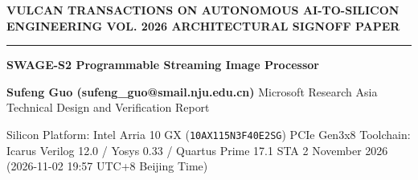 \documentclass[11pt,a4paper]{article}
\begin{document}
{\scriptsize\sffamily\textcolor{vulcan}{\textbf{VULCAN TRANSACTIONS ON AUTONOMOUS AI-TO-SILICON ENGINEERING \hfill VOL. 2026 \textperiodcentered{} ARCHITECTURAL SIGNOFF PAPER}}\par}

\vspace{1pt}\textcolor{vulcan}{\rule{\textwidth}{1.2pt}}\vspace{4pt}

\begin{center}

{\sffamily\LARGE\bfseries SWAGE-S2 Programmable Streaming Image Processor\par}\vspace{3pt}

{\small\sffamily\textbf{Sufeng Guo (\allowbreak{}sufeng\_\allowbreak{}guo@smail.nju.edu.cn)\allowbreak{}} \textperiodcentered{} Microsoft Research Asia \textperiodcentered{} Technical Design and Verification Report\par}\vspace{1pt}

{\scriptsize\sffamily\textcolor{black!75}{Silicon Platform: Intel Arria 10 GX (\texttt{10AX115N3F40E2SG}) PCIe Gen3x8 \textperiodcentered{} Toolchain: Icarus Verilog 12.0 / Yosys 0.33 / Quartus Prime 17.1 STA \textperiodcentered{} 2 November 2026 (\allowbreak{}2026-11-02 19:57 UTC+\allowbreak{}8 Beijing Time)\allowbreak{}}\par}

\end{center}\vspace{2pt}

\renewcommand{\abstractname}{\textcolor{vulcanblue}{Abstract}}\begin{abstract}\noindent SWAGE-S2 extends the preserved SWAGE-S1 scaler with programmable signed 3x3 convolution and forward-2x2 RGGB demosaic. Frame-atomic configuration selects scaling alone or spatial processing followed by scaling. Separate three-line circular buffers avoid frame-sized storage. Software-vs-Hardware numerical comparison established bit-exact Python-reference parity with simulated RTL across 586 completed frames and 286,\allowbreak{}659 output pixels; 89,\allowbreak{}499 scale-only pixels were also compared with the unchanged parent. All seven deliberate RTL mutations were detected. L1 RTL timing lint passed. L2 Intel Quartus Prime 17.1 TimeQuest post-fit analysis achieved WNS\_\allowbreak{}setup =\allowbreak{} +\allowbreak{}5.206 ns at 100 MHz. L3 physical Arria 10 FPGA HIL passed three deterministic bridge-connectivity probes; it did not establish on-board image-processing numerical parity. [\allowbreak{}E021,\allowbreak{} E023–E025]\allowbreak{}\par{}\end{abstract}\vspace{2pt}
\end{document}
